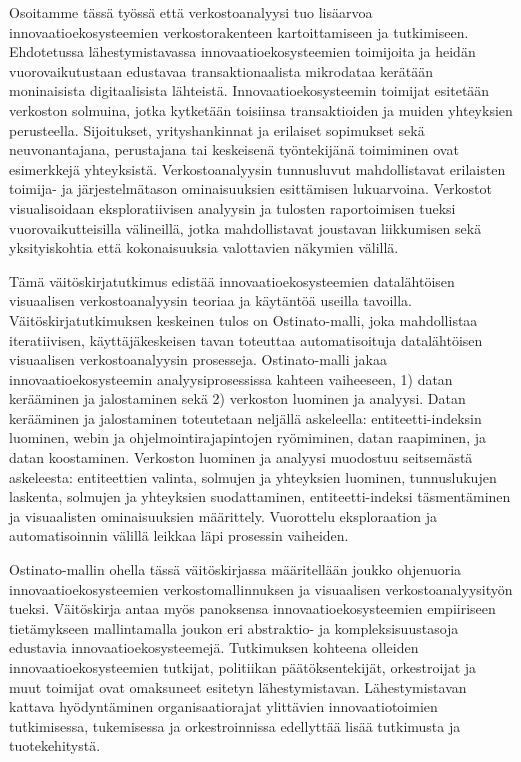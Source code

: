 Osoitamme tässä työssä että verkostoanalyysi tuo lisäarvoa innovaatioekosysteemien verkostorakenteen kartoittamiseen ja tutkimiseen. Ehdotetussa lähestymistavassa innovaatioekosysteemien toimijoita ja heidän vuorovaikutustaan edustavaa transaktionaalista mikrodataa kerätään moninaisista digitaalisista lähteistä. Innovaatioekosysteemin toimijat esitetään verkoston solmuina, jotka kytketään toisiinsa transaktioiden ja muiden yhteyksien perusteella. Sijoitukset, yrityshankinnat ja erilaiset sopimukset sekä neuvonantajana, perustajana tai keskeisenä työntekijänä toimiminen ovat esimerkkejä yhteyksistä. Verkostoanalyysin tunnusluvut mahdollistavat erilaisten toimija- ja järjestelmätason ominaisuuksien esittämisen lukuarvoina. Verkostot visualisoidaan eksploratiivisen analyysin ja tulosten raportoimisen tueksi vuorovaikutteisilla välineillä, jotka mahdollistavat joustavan liikkumisen sekä yksityiskohtia että kokonaisuuksia valottavien näkymien välillä.

Tämä väitöskirjatutkimus edistää innovaatioekosysteemien datalähtöisen visuaalisen verkostoanalyysin teoriaa ja käytäntöä useilla tavoilla. Väitöskirjatutkimuksen keskeinen tulos on Ostinato-malli, joka mahdollistaa iteratiivisen, käyttäjäkeskeisen tavan toteuttaa automatisoituja datalähtöisen visuaalisen verkostoanalyysin prosesseja. Ostinato-malli jakaa innovaatioekosysteemin analyysiprosessissa kahteen vaiheeseen, 1) datan kerääminen ja jalostaminen sekä 2) verkoston luominen ja analyysi. Datan kerääminen ja jalostaminen toteutetaan neljällä askeleella: entiteetti-indeksin luominen, webin ja ohjelmointirajapintojen ryömiminen, datan raapiminen, ja datan koostaminen. Verkoston luominen ja analyysi muodostuu seitsemästä askeleesta: entiteettien valinta, solmujen ja yhteyksien luominen, tunnuslukujen laskenta, solmujen ja yhteyksien suodattaminen, entiteetti-indeksi täsmentäminen ja visuaalisten ominaisuuksien määrittely. Vuorottelu eksploraation ja automatisoinnin välillä leikkaa läpi prosessin vaiheiden. 

Ostinato-mallin ohella tässä väitöskirjassa määritellään joukko ohjenuoria innovaatioekosysteemien verkostomallinnuksen ja visuaalisen verkostoanalyysityön tueksi. Väitöskirja antaa myös panoksensa innovaatioekosysteemien empiiriseen tietämykseen mallintamalla joukon eri abstraktio- ja kompleksisuustasoja edustavia innovaatioekosysteemejä. Tutkimuksen kohteena olleiden innovaatioekosysteemien tutkijat, politiikan päätöksentekijät, orkestroijat ja muut toimijat ovat omaksuneet esitetyn lähestymistavan. Lähestymistavan kattava hyödyntäminen organisaatiorajat ylittävien innovaatiotoimien tutkimisessa, tukemisessa ja orkestroinnissa edellyttää lisää tutkimusta ja tuotekehitystä.